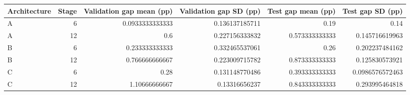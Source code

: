 \begin{tabular}{lrrrrr}
\toprule
Architecture & Stage & Validation gap mean (pp) & Validation gap SD (pp) & Test gap mean (pp) & Test gap SD (pp) \\
\midrule
A & 6 & 0.0933333333333 & 0.136137185711 & 0.19 & 0.14 \\
A & 12 & 0.6 & 0.227156333832 & 0.573333333333 & 0.145716619963 \\
B & 6 & 0.233333333333 & 0.332465537061 & 0.26 & 0.202237484162 \\
B & 12 & 0.766666666667 & 0.223009715782 & 0.873333333333 & 0.125830573921 \\
C & 6 & 0.28 & 0.131148770486 & 0.393333333333 & 0.0986576572463 \\
C & 12 & 1.10666666667 & 0.13316656237 & 0.843333333333 & 0.293995464818 \\
\bottomrule
\end{tabular}
